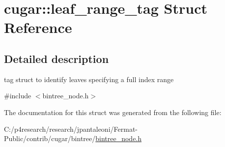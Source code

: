 \hypertarget{structcugar_1_1leaf__range__tag}{}\section{cugar\+:\+:leaf\+\_\+range\+\_\+tag Struct Reference}
\label{structcugar_1_1leaf__range__tag}


\subsection{Detailed description}
tag struct to identify leaves specifying a full index range 

{\ttfamily \#include $<$bintree\+\_\+node.\+h$>$}



The documentation for this struct was generated from the following file\+:\begin{DoxyCompactItemize}
\item 
C\+:/p4research/research/jpantaleoni/\+Fermat-\/\+Public/contrib/cugar/bintree/\hyperlink{bintree__node_8h}{bintree\+\_\+node.\+h}\end{DoxyCompactItemize}
